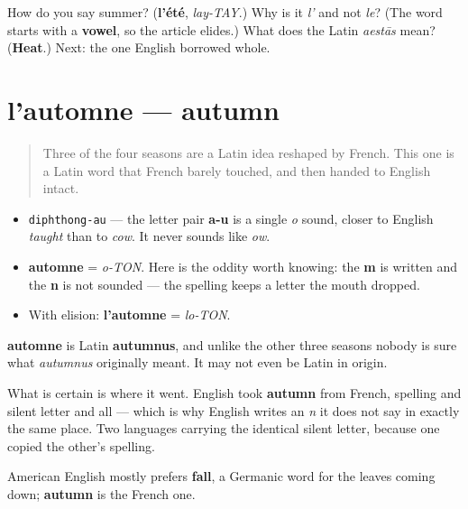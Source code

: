 \begin{tcolorbox}[breakable,colback=teal!4,colframe=teal!35!black,title={Before you move on}]
How do you say summer? (\textbf{l'été}, \emph{lay-TAY}.) Why is it \emph{l'} and not \emph{le}? (The word starts with a \textbf{vowel}, so the article elides.) What does the Latin \emph{aestās} mean? (\textbf{Heat}.) Next: the one English borrowed whole.
\end{tcolorbox}
\section[l'automne]{l'automne — autumn}

\label{lesson:FR-C09-automne}



\begin{quote}
Three of the four seasons are a Latin idea reshaped by French. This one is a Latin word that French barely touched, and then handed to English intact.
\end{quote}

\begin{sounds}
\begin{itemize}
\raggedright
  \item \texttt{diphthong-au} — the letter pair \textbf{a-u} is a single \emph{o} sound, closer to English \emph{taught} than to \emph{cow}. It never sounds like \emph{ow}.
  \item \textbf{automne} = \emph{o-TON}. Here is the oddity worth knowing: the \textbf{m} is written and the \textbf{n} is not sounded — the spelling keeps a letter the mouth dropped.
  \item With elision: \textbf{l'automne} = \emph{lo-TON}.
\end{itemize}
\end{sounds}

\begin{cousinweb}
\textbf{automne} is Latin \textbf{autumnus}, and unlike the other three seasons nobody is sure what \emph{autumnus} originally meant. It may not even be Latin in origin.

What is certain is where it went. English took \textbf{autumn} from French, spelling and silent letter and all — which is why English writes an \emph{n} it does not say in exactly the same place. Two languages carrying the identical silent letter, because one copied the other's spelling.

American English mostly prefers \textbf{fall}, a Germanic word for the leaves coming down; \textbf{autumn} is the French one.
\end{cousinweb}

